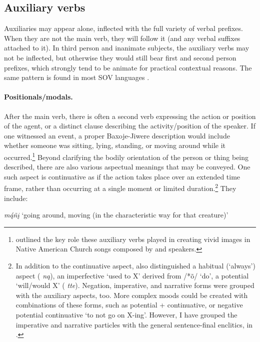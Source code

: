 \documentclass[output=paper]{LSP/langsci}
\begin{document}
\subsection{Auxiliary verbs}
Auxiliaries may appear alone, inflected with the full variety of verbal prefixes. When they are not the main verb, they will follow it (and any verbal suffixes attached to it).  In third person and inanimate subjects, the auxiliary verbs may not be inflected, but otherwise they would still bear first and second person prefixes, which strongly tend to be animate for practical contextual reasons.  The same pattern is found in most SOV languages \citep[490]{Rankin2005b}.  

\noindent
\paragraph*{Positionals/modals.}  After the main verb, there is often a second verb expressing the action or position of the agent, or a distinct clause describing the activity/position of the speaker.  If one witnessed an event, a proper Baxoje-Jiwere description would include whether someone was sitting, lying, standing, or moving around while it occurred.\footnote{\citealt{Davidson1997} outlined the key role these auxiliary verbs played in creating vivid images in Native American Church songs composed by  and  speakers.}  Beyond clarifying the bodily orientation of the person or thing being described, there are also various aspectual meanings that may be conveyed.  One such aspect is continuative as if the action takes place over an extended time frame, rather than occurring at a single moment or limited duration.\footnote{In addition to the continuative aspect, \citet[484--485]{Rankin2005b} also distinguished a habitual (`always') aspect ( \textit{n\k{a}}), an imperfective `used to X' derived from  /*\~o/ `do', a potential `will/would X' ( \textit{tte}). Negation, imperative, and narrative forms were grouped with the auxiliary aspects, too. More complex moods could be created with combinations of these forms, such as potential + continuative, or negative potential continuative `to not go on X-ing'. However, I have grouped the imperative and narrative particles with the general sentence-final enclitics, in .} They include:

\ea
\ea \textit{m\k{á}ñ\k{i}}  {\upshape `going around, moving (in the characteristic way for that creature)'}
	
\end{document}
